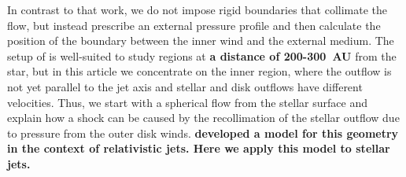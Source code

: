 In contrast to that work, we do not impose rigid boundaries that collimate the flow, but instead prescribe an external pressure profile and then calculate the position of the boundary between the inner wind and the external medium. The setup of \citet{2011ApJ...737...54B} is well-suited to study regions at \textbf{a distance of 200-300~AU} from the star, but in this article we concentrate on the inner region, where the outflow is not yet parallel to the jet axis and stellar and disk outflows have different velocities. Thus, we start with a spherical flow from the stellar surface and explain how a shock can be caused by the recollimation of the stellar outflow due to pressure from the outer disk winds. 
\textbf{\citet{2012MNRAS.422.2282K} developed a model for this geometry in the context of relativistic jets. Here we apply this model to stellar jets.}